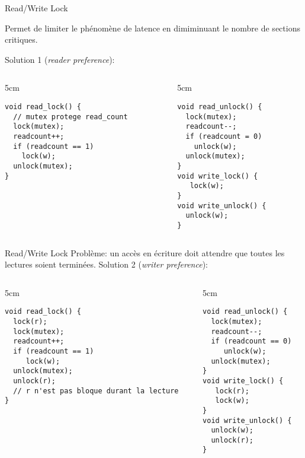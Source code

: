 \begin{frame}[fragile]{Read/Write Lock}

Permet de limiter le phénomène  de latence en dimiminuant le nombre de
sections critiques.

Solution 1 (\emph{reader preference}):
\begin{columns}
  \begin{column} {5cm}
    \begin{lstlisting} 
void read_lock() {
  // mutex protege read_count
  lock(mutex);
  readcount++;
  if (readcount == 1)
    lock(w);
  unlock(mutex);
}
    \end{lstlisting} 
  \end{column}
  \begin{column} {5cm}
    \begin{lstlisting} 
void read_unlock() {
  lock(mutex);
  readcount--;
  if (readcount = 0)
    unlock(w);
  unlock(mutex);
}
void write_lock() {
   lock(w);
}
void write_unlock() {
  unlock(w);
}
    \end{lstlisting} 
  \end{column}
\end{columns}
\end{frame} 

\begin{frame}[fragile]{Read/Write Lock}
  Problème: un accès en écriture doit attendre que toutes les lectures
  soient terminées. Solution 2 (\emph{writer preference}):
  \begin{columns}
    \begin{column} {5cm}
      \begin{lstlisting} 
void read_lock() {
  lock(r);
  lock(mutex);
  readcount++;
  if (readcount == 1)
     lock(w);
  unlock(mutex);
  unlock(r);
  // r n'est pas bloque durant la lecture
}
       \end{lstlisting} 
     \end{column}
     \begin{column} {5cm}
       \begin{lstlisting} 
void read_unlock() {
  lock(mutex);
  readcount--;
  if (readcount == 0)
     unlock(w);
  unlock(mutex);
}
void write_lock() {
   lock(r);
   lock(w);
}
void write_unlock() {
  unlock(w);
  unlock(r);
}
      \end{lstlisting} 
    \end{column}
  \end{columns}
\end{frame} 


